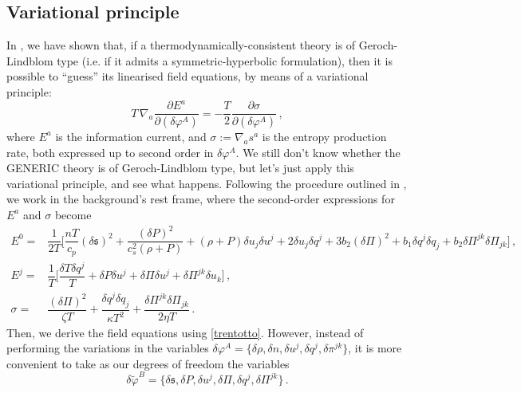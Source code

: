 \documentclass[a4paper, amsfonts, amssymb, amsmath, reprint, showkeys, nofootinbib, twoside, onecolumn, notitlepage]{revtex4-1}
\theoremstyle{definition}
\theoremstyle{theorem}
\begin{document}
\subsection{Variational principle}

In \cite{GavassinoQuasi2022}, we have shown that, if a thermodynamically-consistent theory is of Geroch-Lindblom type \cite{Geroch_Lindblom_1991_causal} (i.e. if it admits a symmetric-hyperbolic formulation), then it is possible to ``guess'' its linearised field equations, by means of a variational principle:
\begin{equation}\label{trentotto}
T \, \nabla_a \dfrac{\partial E^a}{\partial (\delta \varphi^A)} = -\dfrac{T}{2} \dfrac{\partial \sigma}{\partial (\delta \varphi^A)} \, ,
\end{equation}
where $E^a$ is the information current, and $\sigma:=\nabla_a s^a$ is the entropy production rate, both expressed up to second order in $\delta \varphi^A$. We still don't know whether the GENERIC theory is of Geroch-Lindblom type, but let's just apply this variational principle, and see what happens. Following the procedure outlined in \cite{GavassinoQuasi2022}, we work in the background's rest frame, where the second-order expressions for $E^a$ and $\sigma$ become
\begin{equation}
\begin{split}
E^0 =  &  \dfrac{1}{2T} \bigg[  \dfrac{nT}{c_p} (\delta\mathfrak{s})^2 + \dfrac{(\delta P)^2}{c_s^2(\rho+P)}   +  (\rho+P) \delta u_j \delta u^j+2\delta u_j \delta q^j +3b_2 (\delta \Pi)^2+ b_1  \delta q^j \delta q_j    +b_2  \delta \Pi^{jk}\delta \Pi_{jk} \bigg] \, , 
\\
E^j =  &  \dfrac{1}{T} \bigg[\dfrac{\delta T \delta q^j}{T} + \delta P\delta u ^j+\delta \Pi \delta u ^j +  \delta \Pi^{jk} \delta u_k \bigg] \, , 
\\
\sigma  =  & \dfrac{(\delta\Pi)^2}{\zeta T} +\dfrac{\delta q^j \delta q_j}{\kappa T^2} + \dfrac{\delta \Pi^{jk}\delta\Pi_{jk}}{2\eta T} \, . 
\end{split}
\end{equation}
Then, we derive the field equations using \eqref{trentotto}. However, instead of performing the variations in the variables $\delta\varphi^A = \{\delta\rho, \delta n, \delta u^j , \delta q^j , \delta \pi^{jk} \}$, it is more convenient to take as our degrees of freedom the variables
\begin{equation}
\delta \tilde{\varphi}^B = \{ \delta\mathfrak{s}, \delta P, \delta u^j ,\delta \Pi, \delta q^j , \delta \Pi^{jk} \} \, .
\end{equation}
\end{document}

